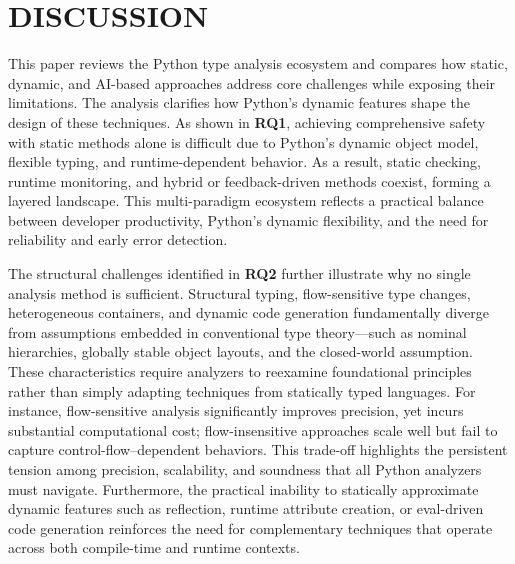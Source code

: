 \section{DISCUSSION}
This paper reviews the Python type analysis ecosystem and compares how static,
dynamic, and AI-based approaches address core challenges while exposing their
limitations.
The analysis clarifies how Python’s dynamic features shape the design of these
techniques.
As shown in \textbf{RQ1}, achieving comprehensive safety with static methods
alone is difficult due to Python’s dynamic object model, flexible typing, and
runtime-dependent behavior.
As a result, static checking, runtime monitoring, and hybrid or feedback-driven
methods coexist, forming a layered landscape.
This multi-paradigm ecosystem reflects a practical balance between developer
productivity, Python’s dynamic flexibility, and the need for reliability and
early error detection.

The structural challenges identified in \textbf{RQ2} further illustrate why no
single analysis method is sufficient.
Structural typing, flow-sensitive type changes, heterogeneous containers, and
dynamic code generation fundamentally diverge from assumptions embedded in
conventional type theory—such as nominal hierarchies, globally stable object
layouts, and the closed-world assumption.
These characteristics require analyzers to reexamine foundational principles
rather than simply adapting techniques from statically typed languages.
For instance, flow-sensitive analysis significantly improves precision, yet
incurs substantial computational cost; flow-insensitive approaches scale well
but fail to capture control-flow–dependent behaviors.
This trade-off highlights the persistent tension among precision, scalability,
and soundness that all Python analyzers must navigate.
Furthermore, the practical inability to statically approximate dynamic features
such as reflection, runtime attribute creation, or eval-driven code generation
reinforces the need for complementary techniques that operate across both
compile-time and runtime contexts.

